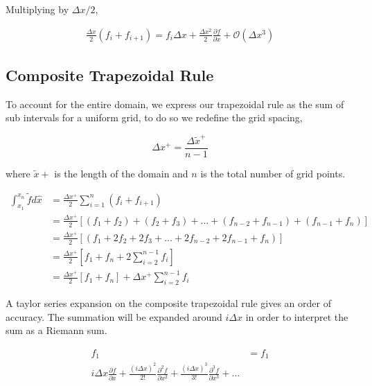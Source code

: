 \documentclass[12pt]{article}
\begin{document}
Multiplying by $\Delta x /2  $,

\begin{align*}
    \frac{\Delta x}{2 }(f_i + f_{i+1} )= 
    f_i {\Delta x} + \frac{\Delta x ^2}{2}\frac{\partial f}{\partial x } +
\mathcal{O}\left( \Delta x^3 \right) 
\end{align*}


\subsection{Composite Trapezoidal Rule}
To account for the entire domain, we express our trapezoidal rule as the sum 
of sub intervals for a uniform grid, to do so we redefine the grid spacing,

\[\Delta x^+   = \frac{\Delta \widetilde{ x}^+  }{n - 1}   \]

where $\widetilde{x}+$ is the length of the domain
and $n$ is the total number of grid points. 

\begin{align*}
    \int_{x_1}^{x_n} \widetilde{f} d \hat{x} &= 
    \frac{\Delta x^+}{2} \sum_{i=1}^{n}
    \left( 
        f_i + f_{i+1}
    \right) \\ 
    &=
    \frac{\Delta x^+}{2}  
    \left[ 
        \left( f_1 + f_2 \right) +
        \left( f_2 + f_3 \right)  +\dots +
        \left( f_{n-2} + f_{n-1} \right) + 
        \left( f_{n-1} + f_{n} \right)  
    \right] \\
    &=
    \frac{\Delta x^+}{2}  
    \left[ 
        \left( f_1 +
            2f_2  +
         2f_3+\dots +
         2f_{n-2} + 
         2f_{n-1}  + 
         f_{n} \right)  
    \right] \\
    &=
    \frac{\Delta x^+}{2}
    \left[ 
        f_1 + f_n + 
        2 \sum_{i=2}^{n-1}
        f_i
    \right] \\
    &=
    \frac{\Delta x^+}{2}
    \left[ 
        f_1 + f_n \right] 
        + 
        \Delta x^+ \sum_{i=2}^{n-1}
    f_i
\end{align*}

A taylor series expansion on the composite trapezoidal rule gives an order of
accuracy.  The summation will be expanded around $ i \Delta x$ in order to
interpret the sum as a Riemann sum.

\begin{align*}
    f_1  &= f_1\\
    i\Delta x \frac{\partial f }{\partial x } +
    \frac{(i\Delta x)^2}{2!} \frac{\partial^2 f }{\partial x^2 } +
    \frac{(i\Delta x)^3}{3!} \frac{\partial^3 f }{\partial x^3 } + \dots
\end{align*}
\end{document}
